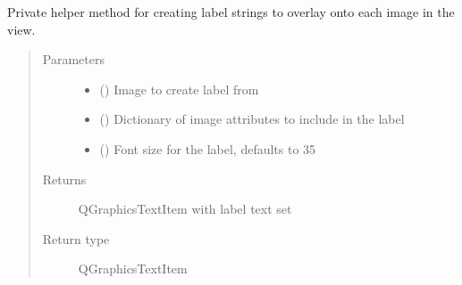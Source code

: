 \documentclass[letterpaper,10pt,english]{sphinxmanual}
\begin{document}
\begin{fulllineitems}
\begin{fulllineitems}
\label{\detokenize{polo.widgets:polo.widgets.plate_viewer.plateViewer._make_image_label}}
Private helper method for creating label strings to overlay onto
each image in the view.
\begin{quote}\begin{description}
\item[{Parameters}] \leavevmode\begin{itemize}
\item {} 
 ({\hyperref[\detokenize{polo.crystallography:polo.crystallography.image.Image}]{}}) \textendash{} Image to create label from

\item {} 
 () \textendash{} Dictionary of image attributes to include in the label

\item {} 
 (\sphinxstyleliteralemphasis{\sphinxupquote{, }}) \textendash{} Font size for the label, defaults to 35

\end{itemize}

\item[{Returns}] \leavevmode
QGraphicsTextItem with label text set

\item[{Return type}] \leavevmode
QGraphicsTextItem

\end{description}\end{quote}

\end{fulllineitems}



\end{fulllineitems}
\end{document}

